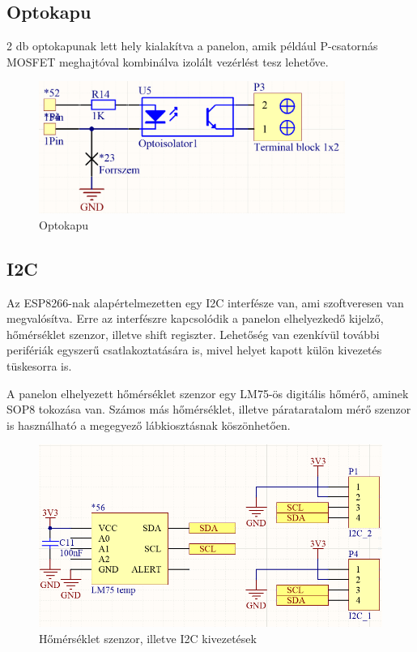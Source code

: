 \subsection{Optokapu}
2 db optokapunak lett hely kialakítva a panelon, amik például P-csatornás MOSFET meghajtóval kombinálva izolált vezérlést tesz lehetőve.

\begin{figure}[!ht]
    \centering
    \includegraphics[width=100mm, keepaspectratio]{figures/opto.png}
    \caption{Optokapu}
    \label{fig:opto_gate}
\end{figure}


\subsection{I2C}
Az ESP8266-nak alapértelmezetten egy I2C interfésze van, ami szoftveresen van megvalósítva. Erre az interfészre kapcsolódik a panelon elhelyezkedő kijelző, hőmérséklet szenzor, illetve shift regiszter. Lehetőség van ezenkívül további perifériák egyszerű csatlakoztatására is, mivel helyet kapott külön kivezetés tüskesorra is.

A panelon elhelyezett hőmérséklet szenzor egy LM75-ös digitális hőmérő, aminek SOP8 tokozása van. Számos más hőmérséklet, illetve párataratalom mérő szenzor is használható a megegyező lábkiosztásnak köszönhetően.
\begin{figure}[!ht]
    \centering
    \includegraphics[width=130mm, keepaspectratio]{figures/i2c_devices.png}
    \caption{Hőmérséklet szenzor, illetve I2C kivezetések}
    \label{fig:i2c}
\end{figure}


